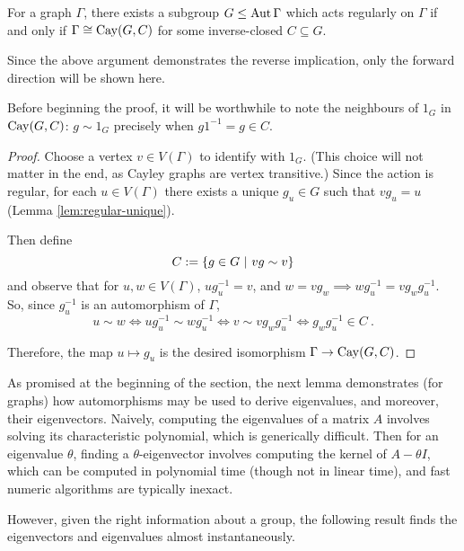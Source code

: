 \documentclass{report}
\begin{document}
    \begin{lem}\label{lem:regular-aut-cayley}
      For a graph $\Gamma$, there exists a subgroup $G \leq \operatorname{Aut} \Gamma$
      which acts regularly on $\Gamma$
      if and only if $\Gamma \cong \operatorname{Cay}(G, C)$
      for some inverse-closed $C \subseteq G$.
    \end{lem}

    Since the above argument demonstrates the reverse implication,
    only the forward direction will be shown here.

    Before beginning the proof, it will be worthwhile to note the neighbours
    of $1_G$ in $\operatorname{Cay}(G, C)$: $g \sim 1_G$ precisely when $g1^{-1} = g \in C$.

    \begin{proof}
      Choose a vertex $v \in V(\Gamma)$ to identify with $1_G$.  (This choice
      will not matter in the end, as Cayley graphs are vertex transitive.)
      Since the action is regular, for each $u \in V(\Gamma)$ there exists a
      unique $g_u \in G$ such that $vg_u = u$ (Lemma \ref{lem:regular-unique}).

      Then define
      $$
        C := \left\lbrace  g \in G \ \middle| \ vg \sim v  \right\rbrace
      $$
      and observe that for $u, w \in V(\Gamma)$,
      $u g_u^{-1} = v$, and $w = v g_w \implies w g_u^{-1} = v g_w g_u^{-1}$.
      So, since $g_u^{-1}$ is an automorphism of $\Gamma$,
      $$
        u \sim w
        \iff u g_u^{-1} \sim w g_u^{-1}
        \iff v \sim v g_w g_u^{-1}
        \iff g_w g_u^{-1} \in C
        \ .
      $$

      Therefore, the map $u \mapsto g_u$ is the desired isomorphism $\Gamma \to
      \operatorname{Cay}(G, C)$.
    \end{proof}

    As promised at the beginning of the section, the next lemma demonstrates
    (for graphs) how automorphisms may be used to derive eigenvalues, and
    moreover, their eigenvectors.
    Naively, computing the eigenvalues of a matrix $A$ involves solving its
    characteristic polynomial, which is generically difficult.
    Then for an eigenvalue $\theta$, finding a $\theta$-eigenvector involves
    computing the kernel of $A - \theta I$, which can be computed in polynomial
    time (though not in linear time), and fast numeric algorithms are typically
    inexact.

    However, given the right information about a group, the following result
    finds the eigenvectors and eigenvalues almost instantaneously.
\end{document}
